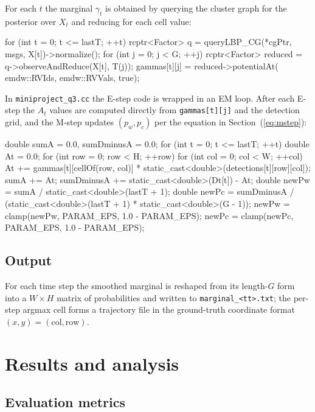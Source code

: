 \documentclass[11pt, a4paper]{article}
\begin{document}
For each $t$ the marginal $\gamma_t$ is obtained by querying the
cluster graph for the posterior over $X_t$ and reducing for each cell value:

\begin{cppd}
for (int t = 0; t <= lastT; ++t) {
  rcptr<Factor> q = queryLBP_CG(*cgPtr, msgs, {X[t]})->normalize();
  for (int j = 0; j < G; ++j) {
    rcptr<Factor> reduced = q->observeAndReduce({X[t]}, {T(j)});
    gammas[t][j] = reduced->potentialAt(
        emdw::RVIds{}, emdw::RVVals{}, true);
  }
}
\end{cppd}

\noindent In \texttt{miniproject\_q3.cc} the E-step code is wrapped in
an EM loop. After each E-step the
$A_t$ values are computed directly from \texttt{gammas[t][j]} and the detection
grid, and the M-step updates $(p_w, p_c)$ per the equation in Section~(\ref{eq:mstep}):

\begin{cppd}
double sumA = 0.0, sumDminusA = 0.0;
for (int t = 0; t <= lastT; ++t) {
  double At = 0.0;
  for (int row = 0; row < H; ++row)
    for (int col = 0; col < W; ++col)
      At += gammas[t][cellOf(row, col)] * static_cast<double>(detections[t][row][col]);
  sumA += At;
  sumDminusA += static_cast<double>(Dt[t]) - At;
}
double newPw = sumA / static_cast<double>(lastT + 1);
double newPc = sumDminusA / (static_cast<double>(lastT + 1) * static_cast<double>(G - 1));
newPw = clamp(newPw, PARAM_EPS, 1.0 - PARAM_EPS);
newPc = clamp(newPc, PARAM_EPS, 1.0 - PARAM_EPS);
\end{cppd}

\subsection{Output}

For each time step the smoothed marginal is reshaped from its length-$G$
form into a $W \times H$ matrix of probabilities and written to
\texttt{marginal\_<tt>.txt}; the per-step argmax cell forms a trajectory
file in the ground-truth coordinate format $(x, y) = (\text{col},
\text{row})$.

\section{Results and analysis}
\label{sec:results}

\subsection{Evaluation metrics}
\end{document}
